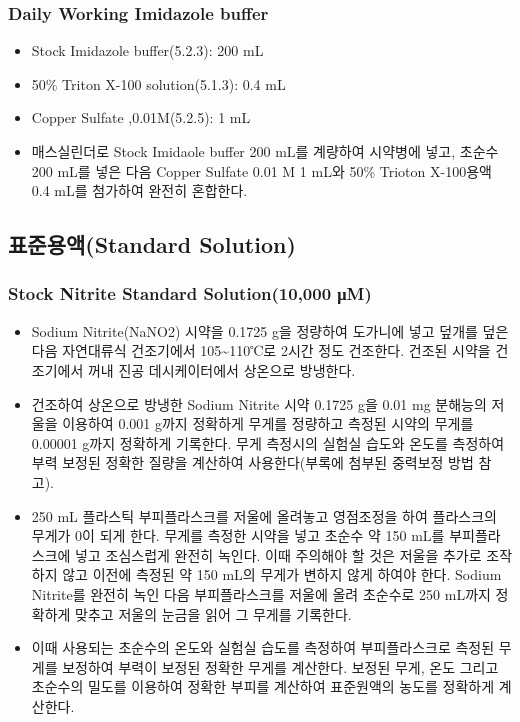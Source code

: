 \documentclass[
]{book}
\providecommand{\tightlist}{%
  \setlength{\itemsep}{0pt}\setlength{\parskip}{0pt}}
\begin{document}
\hypertarget{daily-working-imidazole-buffer}{%
\subsubsection{Daily Working Imidazole buffer}\label{daily-working-imidazole-buffer}}

\begin{itemize}
\tightlist
\item
  Stock Imidazole buffer(5.2.3): 200 mL
\item
  50\% Triton X-100 solution(5.1.3): 0.4 mL
\item
  Copper Sulfate ,0.01M(5.2.5): 1 mL
\item
  매스실린더로 Stock Imidaole buffer 200 mL를 계량하여 시약병에 넣고, 초순수 200 mL를 넣은 다음 Copper Sulfate 0.01 M 1 mL와 50\% Trioton X-100용액 0.4 mL를 첨가하여 완전히 혼합한다.
\end{itemize}

\hypertarget{uxd45cuxc900uxc6a9uxc561standard-solution}{%
\subsection{표준용액(Standard Solution)}\label{uxd45cuxc900uxc6a9uxc561standard-solution}}

\hypertarget{stock-nitrite-standard-solution10000-ux3bcm}{%
\subsubsection{Stock Nitrite Standard Solution(10,000 μM)}\label{stock-nitrite-standard-solution10000-ux3bcm}}

\begin{itemize}
\tightlist
\item
  Sodium Nitrite(NaNO2) 시약을 0.1725 g을 정량하여 도가니에 넣고 덮개를 덮은 다음 자연대류식 건조기에서 105\textasciitilde110℃로 2시간 정도 건조한다. 건조된 시약을 건조기에서 꺼내 진공 데시케이터에서 상온으로 방냉한다.
\item
  건조하여 상온으로 방냉한 Sodium Nitrite 시약 0.1725 g을 0.01 mg 분해능의 저울을 이용하여 0.001 g까지 정확하게 무게를 정량하고 측정된 시약의 무게를 0.00001 g까지 정확하게 기록한다. 무게 측정시의 실험실 습도와 온도를 측정하여 부력 보정된 정확한 질량을 계산하여 사용한다(부록에 첨부된 중력보정 방법 참고).
\item
  250 mL 플라스틱 부피플라스크를 저울에 올려놓고 영점조정을 하여 플라스크의 무게가 0이 되게 한다. 무게를 측정한 시약을 넣고 초순수 약 150 mL를 부피플라스크에 넣고 조심스럽게 완전히 녹인다. 이때 주의해야 할 것은 저울을 추가로 조작하지 않고 이전에 측정된 약 150 mL의 무게가 변하지 않게 하여야 한다. Sodium Nitrite를 완전히 녹인 다음 부피플라스크를 저울에 올려 초순수로 250 mL까지 정확하게 맞추고 저울의 눈금을 읽어 그 무게를 기록한다.
\item
  이때 사용되는 초순수의 온도와 실험실 습도를 측정하여 부피플라스크로 측정된 무게를 보정하여 부력이 보정된 정확한 무게를 계산한다. 보정된 무게, 온도 그리고 초순수의 밀도를 이용하여 정확한 부피를 계산하여 표준원액의 농도를 정확하게 계산한다.
\end{itemize}
\end{document}

